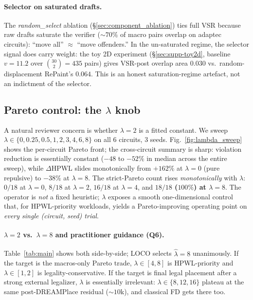 \documentclass{article}
\begin{document}
\paragraph{Selector on saturated drafts.} The \emph{random\_select}
ablation (\S\ref{sec:component_ablation}) ties full VSR because raw
drafts saturate the verifier ($\sim 70\%$ of macro pairs overlap on
adaptec circuits): ``move all'' $\approx$ ``move offenders.''  In the
un-saturated regime, the selector signal does carry weight: the toy
2D experiment (\S\ref{sec:supp-toy2d}, baseline $v=11.2$ over
$\binom{30}{2}=435$ pairs) gives VSR-post overlap area $0.030$ vs.\
random-displacement RePaint's $0.064$.  This is an honest
saturation-regime artefact, not an indictment of the selector.

\subsection{Pareto control: the $\lambda$ knob}
\label{sec:lambda_sweep}

A natural reviewer concern is whether $\lambda{=}2$ is a fitted constant.
We sweep $\lambda \in \{0, 0.25, 0.5, 1, 2, 3, 4, 6, 8\}$ on all 6 circuits,
3 seeds.  Fig.~\ref{fig:lambda_sweep} shows the per-circuit Pareto front;
the cross-circuit summary is sharp: violation reduction is essentially
constant ($-48$ to $-52\%$ in median across the entire sweep), while
$\Delta$HPWL slides monotonically from $+162\%$ at $\lambda=0$ (pure
repulsive) to $-38\%$ at $\lambda=8$.  The strict-Pareto count rises
\emph{monotonically} with $\lambda$: $0/18$ at $\lambda=0$, $8/18$ at
$\lambda=2$, $16/18$ at $\lambda=4$, and \textbf{$18/18$ ($100\%$)
at $\lambda=8$}.  The operator
is \emph{not} a fixed heuristic; $\lambda$ exposes a smooth one-dimensional
control that, for HPWL-priority workloads, yields a Pareto-improving
operating point on \emph{every single (circuit, seed) trial}.

\paragraph{$\lambda{=}2$ vs.\ $\lambda{=}8$ and practitioner guidance (Q6).}
Table~\ref{tab:main} shows both side-by-side; LOCO selects
$\hat\lambda{=}8$ unanimously.  If the target is the macros-only
Pareto trade, $\lambda \in [4,8]$ is HPWL-priority and
$\lambda \in [1,2]$ is legality-conservative.  If the target is final
legal placement after a strong external legalizer, $\lambda$ is
essentially irrelevant: $\lambda\in\{8,12,16\}$ plateau at the same
post-DREAMPlace residual ($\sim 10$k), and classical FD gets there
too.
\end{document}
